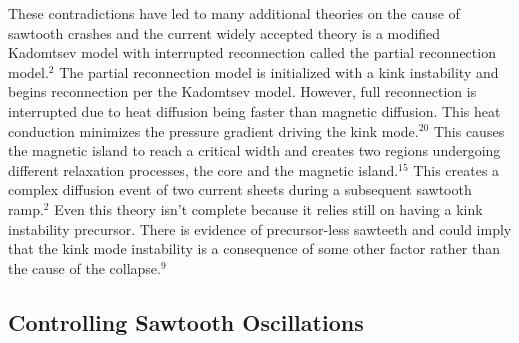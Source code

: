 \documentclass{article}
\begin{document}
\newpage
\begin{SCfigure}
\centering
{}
\end{SCfigure}
\begin{SCfigure}
\centering
{}
\end{SCfigure}
These contradictions have led to many additional theories on the cause of sawtooth crashes and the current widely accepted theory is a modified Kadomtsev model with interrupted reconnection called the partial reconnection model.$^{2}$  The partial reconnection model is initialized with a kink instability and begins reconnection per the Kadomtsev model.  However, full reconnection is interrupted due to heat diffusion being faster than magnetic diffusion.  This heat conduction minimizes the pressure gradient driving the kink mode.$^{20}$  This causes the magnetic island to reach a critical width and creates two regions undergoing different relaxation processes, the core and the magnetic island.$^{15}$  This creates a complex diffusion event of two current sheets during a subsequent sawtooth ramp.$^{2}$  Even this theory isn't complete because it relies still on having a kink instability precursor.  There is evidence of precursor-less sawteeth and could imply that the kink mode instability is a consequence of some other factor rather than the cause of the collapse.$^{9}$
\subsection{Controlling Sawtooth Oscillations}
\end{document}
